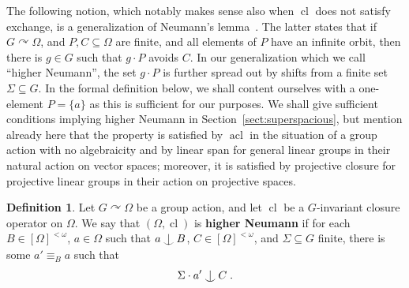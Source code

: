 \documentclass{article}
\theoremstyle{remark}
\theoremstyle{definition}
\newtheorem{definition}[theorem]{Definition}
\def\acts{\curvearrowright}
\newcommand{\remmic}[1]{\textcolor{orange}{MP: #1}}
\DeclareMathOperator{\cl}{cl}
\DeclareMathOperator{\acl}{acl}
\def\Ind#1#2{#1\setbox0=\hbox{$#1x$}\kern\wd0\hbox to 0pt{\hss$#1\mid$\hss}
	\lower.9\ht0\hbox to 0pt{\hss$#1\smile$\hss}\kern\wd0}
\def\ind{\mathop{\mathpalette\Ind{}}}
\begin{document}
{{%


{The following notion, which notably makes sense also when $\cl$ does not satisfy exchange, is  a generalization of Neumann's lemma~\cite{neumann1976structure}.}
The latter states that if $G\acts \Omega$, and $P, C\subseteq \Omega$ are finite, and all elements of $P$ have an infinite orbit, then there is $g\in G$ such that $g\cdot  P$ avoids $C$. In our generalization which we call ``higher Neumann'', the set $g\cdot P$ is further spread out by shifts 
{from} a finite set $\Sigma\subseteq G$. In the formal definition below, we shall content ourselves with a one-element $P=\{a\}$ as this is sufficient for our purposes. We shall give sufficient conditions  implying  higher Neumann in Section~\ref{sect:superspacious}, but mention already here  that the property is satisfied by $\acl$ in the situation of a group action with no algebraicity and  by linear span for 
general linear groups in their natural action on  vector spaces; {moreover, it is satisfied by projective closure for projective {linear} groups in their action on projective spaces.}} 


\begin{definition}\label{def:higherneumann}
   {Let $G\acts\Omega$ be a group action, and  let $\cl$ be a $G$-invariant closure operator on $\Omega$.} We say that 
   $(\Omega, {\cl})$ is \textbf{higher Neumann}
    if for each $B\in[\Omega]^{<\omega}$, $a\in\Omega$ such that $a\ind B$, $C\in[\Omega]^{<\omega}$, and $\Sigma\subseteq G$ finite, there is some $a'\equiv_B a$ such that 
\[\Sigma \cdot  a'\ind C\;.\]
\end{definition}

}
\end{document}
